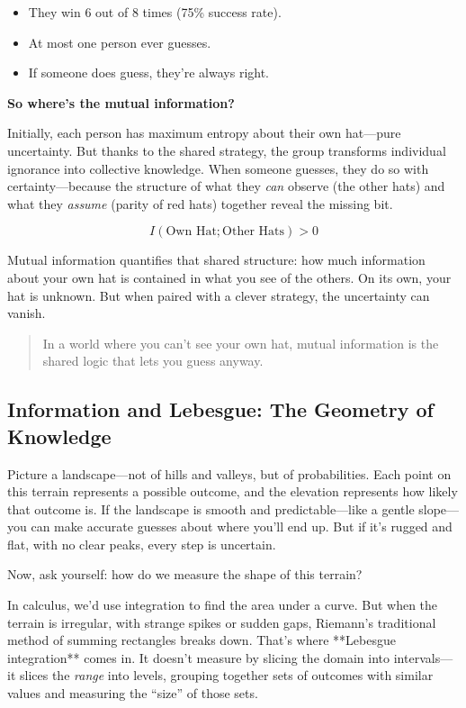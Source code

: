 \begin{itemize}
  \item They win 6 out of 8 times (75\% success rate).
  \item At most one person ever guesses.
  \item If someone does guess, they’re always right.
\end{itemize}

\textbf{So where’s the mutual information?}

Initially, each person has maximum entropy about their own hat—pure uncertainty. But thanks to the shared strategy, the group transforms individual ignorance into collective knowledge. When someone guesses, they do so with certainty—because the structure of what they \emph{can} observe (the other hats) and what they \emph{assume} (parity of red hats) together reveal the missing bit.

\[
I(\text{Own Hat}; \text{Other Hats}) > 0
\]

Mutual information quantifies that shared structure: how much information about your own hat is contained in what you see of the others. On its own, your hat is unknown. But when paired with a clever strategy, the uncertainty can vanish.

\begin{quote}
In a world where you can’t see your own hat, mutual information is the shared logic that lets you guess anyway.
\end{quote}









\subsection{Information and Lebesgue: The Geometry of Knowledge}

Picture a landscape—not of hills and valleys, but of probabilities. Each point on this terrain represents a possible outcome, and the elevation represents how likely that outcome is. If the landscape is smooth and predictable—like a gentle slope—you can make accurate guesses about where you’ll end up. But if it’s rugged and flat, with no clear peaks, every step is uncertain.

Now, ask yourself: how do we measure the shape of this terrain?

In calculus, we’d use integration to find the area under a curve. But when the terrain is irregular, with strange spikes or sudden gaps, Riemann’s traditional method of summing rectangles breaks down. That’s where **Lebesgue integration** comes in. It doesn’t measure by slicing the domain into intervals—it slices the \emph{range} into levels, grouping together sets of outcomes with similar values and measuring the “size” of those sets.


